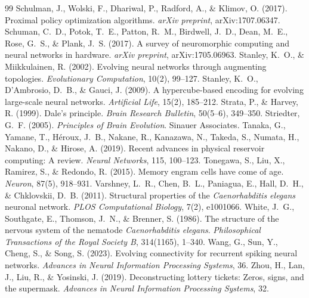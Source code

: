 \documentclass[10pt]{article}
\begin{document}
\begin{thebibliography}{99}
Schulman, J., Wolski, F., Dhariwal, P., Radford, A., \& Klimov, O. (2017). Proximal policy optimization algorithms. \textit{arXiv preprint}, arXiv:1707.06347.
Schuman, C.~D., Potok, T.~E., Patton, R.~M., Birdwell, J.~D., Dean, M.~E., Rose, G.~S., \& Plank, J.~S. (2017). A survey of neuromorphic computing and neural networks in hardware. \textit{arXiv preprint}, arXiv:1705.06963.
Stanley, K.~O., \& Miikkulainen, R. (2002). Evolving neural networks through augmenting topologies. \textit{Evolutionary Computation}, 10(2), 99--127.
Stanley, K.~O., D'Ambrosio, D.~B., \& Gauci, J. (2009). A hypercube-based encoding for evolving large-scale neural networks. \textit{Artificial Life}, 15(2), 185--212.
Strata, P., \& Harvey, R. (1999). Dale's principle. \textit{Brain Research Bulletin}, 50(5--6), 349--350.
Striedter, G.~F. (2005). \textit{Principles of Brain Evolution}. Sinauer Associates.
Tanaka, G., Yamane, T., H\'{e}roux, J.~B., Nakane, R., Kanazawa, N., Takeda, S., Numata, H., Nakano, D., \& Hirose, A. (2019). Recent advances in physical reservoir computing: A review. \textit{Neural Networks}, 115, 100--123.
Tonegawa, S., Liu, X., Ramirez, S., \& Redondo, R. (2015). Memory engram cells have come of age. \textit{Neuron}, 87(5), 918--931.
Varshney, L.~R., Chen, B.~L., Paniagua, E., Hall, D.~H., \& Chklovskii, D.~B. (2011). Structural properties of the \textit{Caenorhabditis elegans} neuronal network. \textit{PLOS Computational Biology}, 7(2), e1001066.
White, J.~G., Southgate, E., Thomson, J.~N., \& Brenner, S. (1986). The structure of the nervous system of the nematode \textit{Caenorhabditis elegans}. \textit{Philosophical Transactions of the Royal Society B}, 314(1165), 1--340.
Wang, G., Sun, Y., Cheng, S., \& Song, S. (2023). Evolving connectivity for recurrent spiking neural networks. \textit{Advances in Neural Information Processing Systems}, 36.
Zhou, H., Lan, J., Liu, R., \& Yosinski, J. (2019). Deconstructing lottery tickets: Zeros, signs, and the supermask. \textit{Advances in Neural Information Processing Systems}, 32.
\end{thebibliography}
\end{document}
